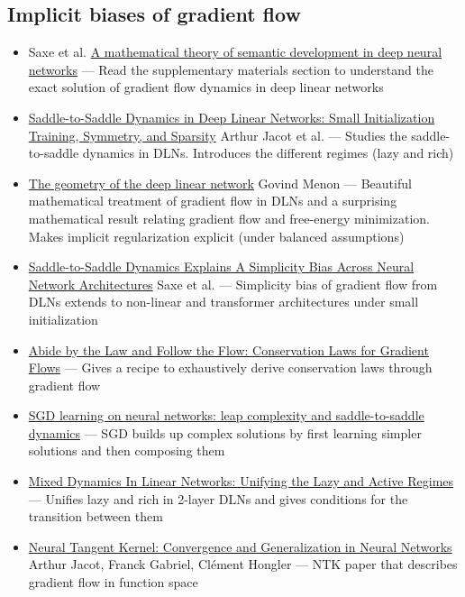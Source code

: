 \documentclass[11pt]{article}
\begin{document}
\subsection*{Implicit biases of gradient flow}
\begin{itemize}
  \item Saxe et al. \href{https://www.pnas.org/doi/10.1073/pnas.1820226116}{A mathematical theory of semantic development in deep neural networks} --- Read the supplementary materials section to understand the exact solution of gradient flow dynamics in deep linear networks
  \item \href{https://arxiv.org/abs/2106.15933}{Saddle-to-Saddle Dynamics in Deep Linear Networks: Small Initialization Training, Symmetry, and Sparsity} Arthur Jacot et al. --- Studies the saddle-to-saddle dynamics in DLNs. Introduces the different regimes (lazy and rich)
  \item \href{https://arxiv.org/abs/2411.09004}{The geometry of the deep linear network} Govind Menon --- Beautiful mathematical treatment of gradient flow in DLNs and a surprising mathematical result relating gradient flow and free-energy minimization. Makes implicit regularization explicit (under balanced assumptions)
  \item \href{https://arxiv.org/abs/2512.20607}{Saddle-to-Saddle Dynamics Explains A Simplicity Bias Across Neural Network Architectures} Saxe et al. --- Simplicity bias of gradient flow from DLNs extends to non-linear and transformer architectures under small initialization
  \item \href{https://arxiv.org/abs/2307.00144}{Abide by the Law and Follow the Flow: Conservation Laws for Gradient Flows} --- Gives a recipe to exhaustively derive conservation laws through gradient flow
  \item \href{https://arxiv.org/abs/2302.11055}{SGD learning on neural networks: leap complexity and saddle-to-saddle dynamics} --- SGD builds up complex solutions by first learning simpler solutions and then composing them
  \item \href{https://arxiv.org/abs/2405.17580}{Mixed Dynamics In Linear Networks: Unifying the Lazy and Active Regimes} --- Unifies lazy and rich in 2-layer DLNs and gives conditions for the transition between them
  \item \href{https://arxiv.org/abs/1806.07572}{Neural Tangent Kernel: Convergence and Generalization in Neural Networks} Arthur Jacot, Franck Gabriel, Clément Hongler --- NTK paper that describes gradient flow in function space

\end{itemize}
\end{document}
